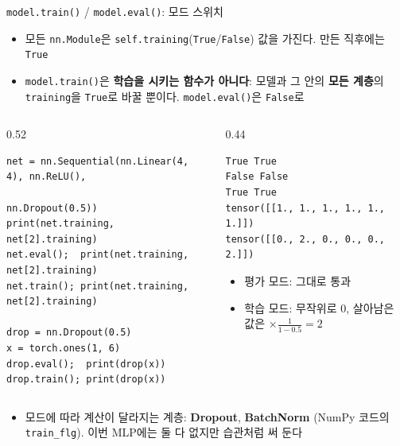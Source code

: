 \documentclass[aspectratio=169,11pt]{beamer}
\newcommand{\code}[1]{\texttt{#1}}
\begin{document}
\begin{frame}[fragile]{\code{model.train()} / \code{model.eval()}: 모드 스위치}
\small
\begin{itemize}
\item 모든 \code{nn.Module}은 \code{self.training}(\code{True}/\code{False}) 값을 가진다. 만든 직후에는 \code{True}
\item \code{model.train()}은 \textbf{학습을 시키는 함수가 아니다}: 모델과 그 안의 \textbf{모든 계층}의 \code{training}을 \code{True}로 바꿀 뿐이다. \code{model.eval()}은 \code{False}로
\end{itemize}
\begin{columns}[T,onlytextwidth]
\begin{column}{0.52\textwidth}
\begin{lstlisting}
net = nn.Sequential(nn.Linear(4, 4), nn.ReLU(),
                    nn.Dropout(0.5))
print(net.training, net[2].training)
net.eval();  print(net.training, net[2].training)
net.train(); print(net.training, net[2].training)

drop = nn.Dropout(0.5)
x = torch.ones(1, 6)
drop.eval();  print(drop(x))
drop.train(); print(drop(x))
\end{lstlisting}
\end{column}
\begin{column}{0.44\textwidth}
\begin{lstlisting}[style=outstyle]
True True
False False
True True
tensor([[1., 1., 1., 1., 1., 1.]])
tensor([[0., 2., 0., 0., 0., 2.]])
\end{lstlisting}
\small
\begin{itemize}
\item 평가 모드: 그대로 통과
\item 학습 모드: 무작위로 $0$, 살아남은 값은 $\times\frac{1}{1-0.5}=2$
\end{itemize}
\end{column}
\end{columns}
\begin{itemize}
\item 모드에 따라 계산이 달라지는 계층: \textbf{Dropout}, \textbf{BatchNorm} (NumPy 코드의 \code{train\_flg}). 이번 MLP에는 둘 다 없지만 습관처럼 써 둔다
\end{itemize}
\end{frame}
\end{document}
